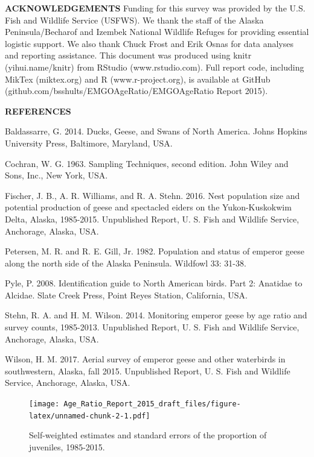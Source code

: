 \documentclass[]{article}
\begin{document}
\textbf{ACKNOWLEDGEMENTS}\newline
Funding for this survey was provided by the U.S. Fish and Wildlife
Service (USFWS). We thank the staff of the Alaska Peninsula/Becharof and
Izembek National Wildlife Refuges for providing essential logistic
support. We also thank Chuck Frost and Erik Osnas for data analyses and
reporting assistance. This document was produced using knitr
(yihui.name/knitr) from RStudio (www.rstudio.com). Full report code,
including MikTex (miktex.org) and R (www.r-project.org), is available at
GitHub (github.com/bsshults/EMGOAgeRatio/EMGOAgeRatio Report 2015).

\textbf{REFERENCES}

\setlength{\parindent}{-0.2in} \setlength{\leftskip}{0.2in}
\setlength{\parskip}{1ex} Baldassarre, G. 2014. Ducks, Geese, and Swans
of North America. Johns Hopkins University Press, Baltimore, Maryland,
USA.

Cochran, W. G. 1963. Sampling Techniques, second edition. John Wiley and
Sons, Inc., New York, USA.

Fischer, J. B., A. R. Williams, and R. A. Stehn. 2016. Nest population
size and potential production of geese and spectacled eiders on the
Yukon-Kuskokwim Delta, Alaska, 1985-2015. Unpublished Report, U. S. Fish
and Wildlife Service, Anchorage, Alaska, USA.

Petersen, M. R. and R. E. Gill, Jr. 1982. Population and status of
emperor geese along the north side of the Alaska Peninsula. Wildfowl 33:
31-38.

Pyle, P. 2008. Identification guide to North American birds. Part 2:
Anatidae to Alcidae. Slate Creek Press, Point Reyes Station, California,
USA.

Stehn, R. A. and H. M. Wilson. 2014. Monitoring emperor geese by age
ratio and survey counts, 1985-2013. Unpublished Report, U. S. Fish and
Wildlife Service, Anchorage, Alaska, USA.

Wilson, H. M. 2017. Aerial survey of emperor geese and other waterbirds
in southwestern, Alaska, fall 2015. Unpublished Report, U. S. Fish and
Wildlife Service, Anchorage, Alaska, USA.

\newpage

\begin{figure}[htbp]
\centering
\texttt{[image: Age\_Ratio\_Report\_2015\_draft\_files/figure-latex/unnamed-chunk-2-1.pdf]}
\caption{Self-weighted estimates and standard errors of the proportion
of juveniles, 1985-2015.}
\end{figure}
\end{document}
